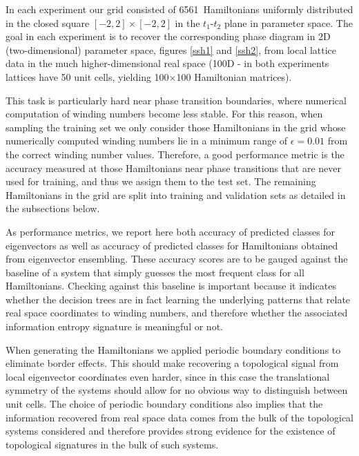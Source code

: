\documentclass[10pt]{revtex4-1}
\newcommand\nHam{6561}  %
\newcommand\epsilonValue{0.01}  %
\begin{document}
In each experiment our grid consisted of \nHam\ Hamiltonians uniformly distributed in the closed square $[-2,2]\times[-2,2]$ in the $t_1$-$t_2$ plane in parameter space. The goal in each experiment is to recover the corresponding phase diagram in 2D (two-dimensional) parameter space, figures \ref{ssh1} and \ref{ssh2}, from local lattice data in the much higher-dimensional real space (100D - in both experiments lattices have 50 unit cells, yielding 100$\times$100 Hamiltonian matrices).

This task is particularly hard near phase transition boundaries, where numerical computation of winding numbers become less stable. For this reason, when sampling the training set we only consider those Hamiltonians in the grid whose numerically computed winding numbers lie in a minimum range of $\epsilon = \epsilonValue$ from the correct winding number values. Therefore, a good performance metric is the accuracy measured at those Hamiltonians near phase transitions that are never used for training, and thus we assign them to the test set. The remaining Hamiltonians in the grid are split into training and validation sets as detailed in the subsections below.

As performance metrics, we report here both accuracy of predicted classes for eigenvectors as well as accuracy of predicted classes for Hamiltonians obtained from eigenvector ensembling. These accuracy scores are to be gauged against the baseline of a system that simply guesses the most frequent class for all Hamiltonians. Checking against this baseline is important because it indicates whether the decision trees are in fact learning the underlying patterns that relate real space coordinates to winding numbers, and therefore whether the associated information entropy signature is meaningful or not.

When generating the Hamiltonians we applied periodic boundary conditions to eliminate border effects. This should make recovering a topological signal from local eigenvector coordinates even harder, since in this case the translational symmetry of the systems should allow for no obvious way to distinguish between unit cells. The choice of periodic boundary conditions also implies that the information recovered from real space data comes from the bulk of the topological systems considered and therefore provides strong evidence for the existence of topological signatures in the bulk of such systems. 
\end{document}

